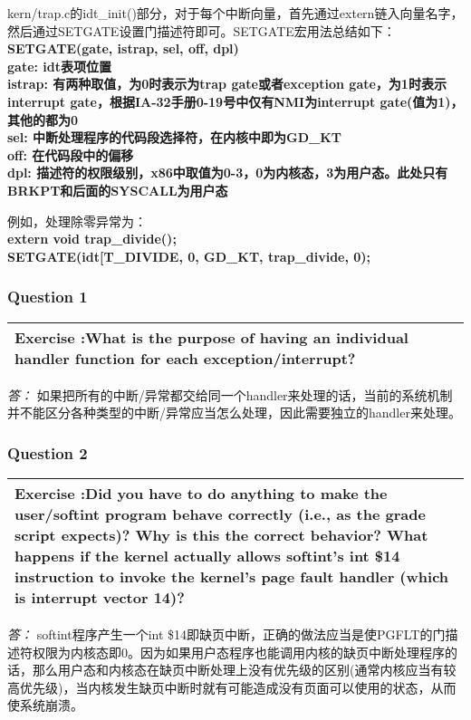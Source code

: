 \documentclass[11pt,a4paper]{article}
\newcommand{\exercise}[2]{
\begin{tabular}{|p{\textwidth}|}
\hline
Exercise #1:#2\\
\hline
\end{tabular}
\textit{\large{答：}}}
\begin{document}
kern/trap.c的idt\_init()部分，对于每个中断向量，首先通过extern链入向量名字，然后通过SETGATE设置门描述符即可。SETGATE宏用法总结如下：\\
\textbf{SETGATE(gate, istrap, sel, off, dpl)\\
gate: idt表项位置\\
istrap: 有两种取值，为0时表示为trap gate或者exception gate，为1时表示interrupt gate，根据IA-32手册0-19号中仅有NMI为interrupt gate(值为1)，其他的都为0\\
sel: 中断处理程序的代码段选择符，在内核中即为GD\_KT\\
off: 在代码段中的偏移\\
dpl: 描述符的权限级别，x86中取值为0-3，0为内核态，3为用户态。此处只有BRKPT和后面的SYSCALL为用户态\\
}

例如，处理除零异常为：\\
\textbf{extern void trap\_divide();\\
SETGATE(idt[T\_DIVIDE, 0, GD\_KT, trap\_divide, 0);\\}

\subsubsection{Question 1}
\exercise{}{What is the purpose of having an individual handler function for each exception/interrupt?}
如果把所有的中断/异常都交给同一个handler来处理的话，当前的系统机制并不能区分各种类型的中断/异常应当怎么处理，因此需要独立的handler来处理。

\subsubsection{Question 2}
\exercise{}{Did you have to do anything to make the user/softint program behave correctly (i.e., as the grade script expects)? Why is this the correct behavior? What happens if the kernel actually allows softint's int \$14 instruction to invoke the kernel's page fault handler (which is interrupt vector 14)?}
softint程序产生一个int \$14即缺页中断，正确的做法应当是使PGFLT的门描述符权限为内核态即0。因为如果用户态程序也能调用内核的缺页中断处理程序的话，那么用户态和内核态在缺页中断处理上没有优先级的区别(通常内核应当有较高优先级)，当内核发生缺页中断时就有可能造成没有页面可以使用的状态，从而使系统崩溃。
\end{document}
